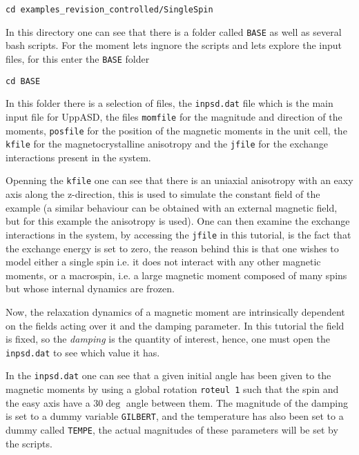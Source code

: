 \documentclass[11pt,fleqn,a4]{book} %
\begin{document}
\begin{fBox} 
\begin{Verbatim}
cd examples_revision_controlled/SingleSpin
\end{Verbatim}
\end{fBox}

In this directory one can see that there is a folder called \verb;BASE; as well as several bash scripts. For the moment lets ingnore the scripts and lets explore the input files, for this enter the \verb;BASE; folder

\begin{fBox} 
\begin{Verbatim}
cd BASE
\end{Verbatim}
\end{fBox}

In this folder there is a selection of files, the \verb;inpsd.dat; file which is the main input file for UppASD, the files \verb;momfile; for the magnitude and direction of the moments, \verb;posfile; for the position of the magnetic moments in the unit cell, the \verb;kfile; for the magnetocrystalline anisotropy and the \verb;jfile; for the exchange interactions present in the system.

Openning the \verb;kfile; one can see that there is an uniaxial anisotropy with an eaxy axis along the z-direction, this is used to simulate the constant field of the example (a similar behaviour can be obtained with an external magnetic field, but for this example the anisotropy is used). One can then examine the exchange interactions in the system, by accessing the \verb;jfile; in this tutorial, is the fact that the exchange energy is set to zero, the reason behind this is that one wishes to model either a single spin i.e. it does not interact with any other magnetic moments, or a macrospin, i.e. a large magnetic moment composed of many spins but whose internal dynamics are frozen.

Now, the relaxation dynamics of a magnetic moment are intrinsically dependent on the fields acting over it and the damping parameter. In this tutorial the field is fixed, so the \textit{damping} is the quantity of interest, hence, one must open the \verb;inpsd.dat; to see which value it has. 

In the \verb;inpsd.dat; one can see that a given initial angle has been given to the magnetic moments by using a global rotation \verb;roteul 1; such that the spin and the easy axis have a $30\deg$ angle between them. The magnitude of the damping is set to a dummy variable \verb;GILBERT;, and the temperature has also been set to a dummy called \verb;TEMPE;, the actual magnitudes of these parameters will be set by the scripts.
\end{document}

